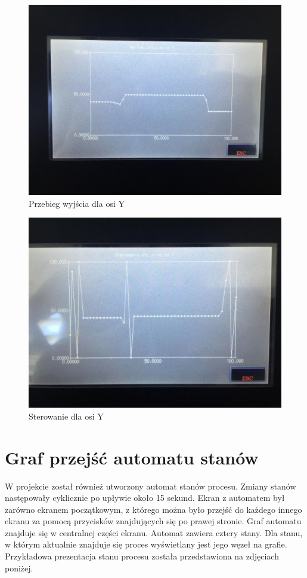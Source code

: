 \begin{figure}[H]
    \label{Wykres::output_y}
    \centering
    \includegraphics[scale=0.15]{./sections/inteco/images/output_y.jpg}
    \caption{Przebieg wyjścia dla osi Y}
\end{figure}

\begin{figure}[H]
    \label{Wykresy::input_y}
    \centering
    \includegraphics[scale=0.15]{./sections/inteco/images/input_y.jpg}
    \caption{Sterowanie dla osi Y}
\end{figure}

\section{Graf przejść automatu stanów}
\label{inteco_wizualizacja_automat}
W projekcie został również utworzony automat stanów procesu. Zmiany stanów następowały cyklicznie po upływie około 15 sekund. Ekran z automatem był zarówno ekranem początkowym, z którego można było przejść do każdego innego ekranu za pomocą przycisków znajdujących się po prawej stronie. Graf automatu znajduje się w centralnej części ekranu. Automat zawiera cztery stany. Dla stanu, w którym aktualnie znajduje się proces wyświetlany jest jego węzeł na grafie. Przykładowa prezentacja stanu procesu została przedstawiona na zdjęciach poniżej.

